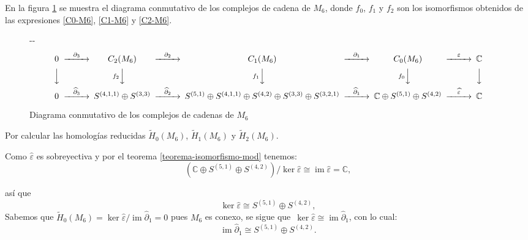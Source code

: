 \documentclass[12pt]{book}
\newlength{\offsetpage}
\newenvironment{widepage}{\begin{adjustwidth}{-\offsetpage}{-\offsetpage}%
    \addtolength{\textwidth}{2\offsetpage}}%
{\end{adjustwidth}}
\theoremstyle{definition}
\DeclareMathOperator{\im}{im}
\newcounter{in}
\begin{document}
  En la figura \ref{fig:diagrama-conmutativo6} se muestra el diagrama
  conmutativo de los complejos de cadena de $M_{6}$, donde $f_{0}$,
  $f_{1}$ y $f_{2}$ son los isomorfismos obtenidos de las expresiones
  \ref{C0-M6}, \ref{C1-M6} y \ref{C2-M6}.

  \begin{figure}[h]
    \centering
    \begin{widepage}
      \scriptsize{
        \[
        \begin{CD}
          0 @>{\partial_{3}}>> C_{2}(M_{6}) @>{\partial_{2}}>> C_{1}(M_{6}) @>{\partial_{1}}>> C_{0}(M_{6}) @>{\varepsilon}>> \mathbb{C}\\
          @VVV @Vf_{2}VV   @Vf_{1}VV  @Vf_{0}VV  @VVV    \\
          0 @>{\widehat\partial_{3}}>> S^{(4,1,1)}\oplus S^{(3,3)}
          @>{\widehat\partial_{2}}>> S^{(5,1)}\oplus S^{(4,1,1)}\oplus
          S^{(4,2)}\oplus S^{(3,3)}\oplus S^{(3,2,1)}
          @>{\widehat\partial_{1}}>> \mathbb{C} \oplus S^{(5,1)}\oplus
          S^{(4,2)} @>{\widehat \varepsilon}>> \mathbb{C}
        \end{CD}
        \]
      }
    \end{widepage}
\caption{Diagrama conmutativo de los complejos de cadenas de $M_{6}$}
\label{fig:diagrama-conmutativo6}
\end{figure}

Por calcular las homologías reducidas $\widetilde
H_{0}(M_{6})$, $\widetilde H_{1}(M_{6})$ y $\widetilde H_{2}(M_{6})$.

Como $\widehat\varepsilon$ es sobreyectiva y por el teorema \ref{teorema-isomorfismo-mod} tenemos:
\begin{equation*}
  (\mathbb{C} \oplus S^{(5,1)}\oplus S^{(4,2)})/\ker\widehat\varepsilon\cong \im \widehat\varepsilon=\mathbb{C},
\end{equation*}

así que
\begin{equation*}
  \label{ker0-M6}
  \ker\widehat\varepsilon\cong  S^{(5,1)}\oplus S^{(4,2)}, 
\end{equation*}
Sabemos que $\widetilde H_{0}(M_{6})=\ker \widehat\varepsilon/\im
\widehat\partial_{1}=0$ pues $M_{6}$ es conexo, se sigue que~$\ker \widehat\varepsilon\cong
\im\widehat\partial_{1}$, con lo cual:
\begin{equation}
  \label{im1-M6}
  \im \widehat\partial_{1}\cong  S^{(5,1)}\oplus S^{(4,2)}. 
\end{equation}
\end{document}
